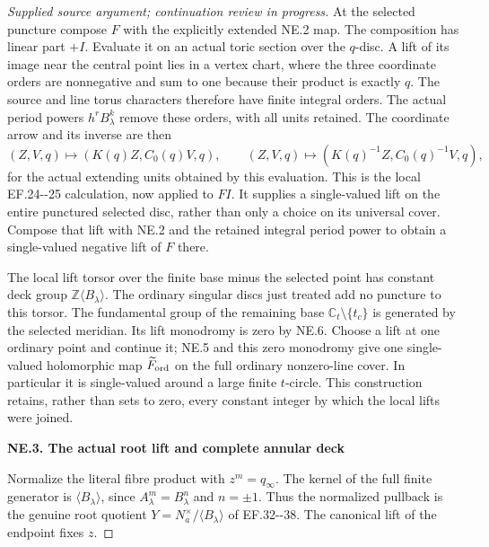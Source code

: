 \begin{proof}[Supplied source argument; continuation review in progress]
At the selected puncture compose \(F\) with the explicitly extended
NE.2 map. The composition has linear part \(+I\). Evaluate it on
an actual toric section over the \(q\)-disc. A lift of its image
near the central point lies in a vertex chart, where the three
coordinate orders are nonnegative and sum to one because their
product is exactly \(q\). The source and line torus characters
therefore have finite integral orders. The actual period powers
\(h^rB_\lambda^k\) remove these orders, with all units retained.
The coordinate arrow and its inverse are then
\[
 (Z,V,q)\longmapsto(K(q)Z,C_0(q)V,q),\qquad
 (Z,V,q)\longmapsto(K(q)^{-1}Z,C_0(q)^{-1}V,q),
 \tag{NE.6}
\]
for the actual extending units obtained by this evaluation. This is
the local EF.24-\/-25 calculation, now applied to \(FI\). It supplies
a single-valued lift on the entire punctured selected disc, rather
than only a choice on its universal cover. Compose that lift with
NE.2 and the retained integral period power to obtain a
single-valued negative lift of \(F\) there.

The local lift torsor over the finite base minus the selected point
has constant deck group \(\mathbb Z\langle B_\lambda\rangle\).
The ordinary singular discs just treated add no puncture to this
torsor. The fundamental group of the remaining base
\(\mathbb C_t\setminus\{t_c\}\) is generated by the selected
meridian. Its lift monodromy is zero by NE.6. Choose a lift at one
ordinary point and continue it; NE.5 and this zero monodromy give
one single-valued holomorphic map \(\widetilde F_{\rm ord}\) on
the full ordinary nonzero-line cover. In particular it is
single-valued around a large finite \(t\)-circle. This construction
retains, rather than sets to zero, every constant integer by which
the local lifts were joined.

\par

\medskip\noindent\textbf{NE.3. The actual root lift and complete annular deck}

\par\nobreak

Normalize the literal fibre product with \(z^m=q_\infty\). The
kernel of the full finite generator is \(\langle B_\lambda\rangle\),
since \(A_\lambda^m=B_\lambda^n\) and \(n=\pm1\). Thus the
normalized pullback is the genuine root quotient
\(Y=N_a^\times/\langle B_\lambda\rangle\) of EF.32-\/-38. The
canonical lift of the endpoint fixes \(z\).


\end{proof}
